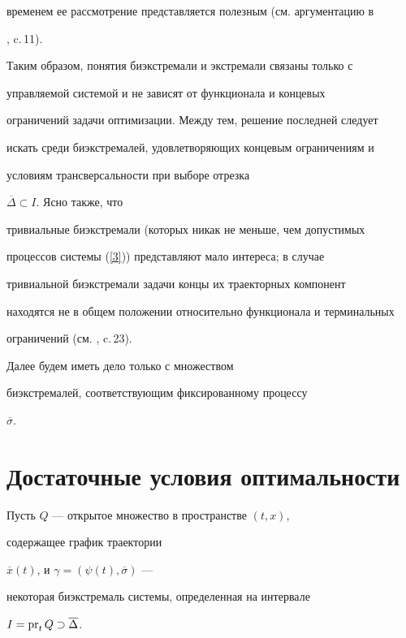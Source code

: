 временем ее рассмотрение представляется полезным (см. аргументацию в


\cite{12}, c.\,11).





Таким образом, понятия биэкстремали и экстремали связаны только с


управляемой системой и не зависят от функционала и концевых


ограничений задачи оптимизации. Между тем, решение последней следует


искать среди биэкстремалей, удовлетворяющих концевым ограничениям и


условиям трансверсальности при выборе отрезка


$\overline{\Delta}\subset I$. Ясно также, что


тривиальные биэкстремали (которых никак не меньше, чем допустимых


процессов системы (\ref{3})) представляют мало интереса; в случае


тривиальной биэкстремали задачи концы их траекторных компонент


находятся не в общем положении относительно функционала и терминальных


ограничений (см. \cite{12}, c.\,23).





Далее будем иметь дело только с множеством


биэкстремалей, соответствующим фиксированному процессу


$\overline{\sigma}$.








\section{Достаточные условия оптимальности}





Пусть $Q$ --- открытое множество в пространстве $(t,x)$,


содержащее график траектории


$\overline{x}(t)$, и $\gamma =(\psi (t), \overline{\sigma})$ ---


некоторая биэкстремаль системы, определенная на интервале


$I=\operatorname{pr}_t Q\supset\overline{\Delta}$.





